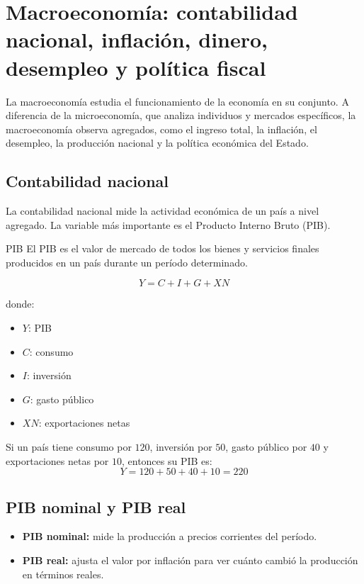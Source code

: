 \section{Macroeconomía: contabilidad nacional, inflación, dinero, desempleo y política fiscal}
\label{sec:macroeconomia}

La macroeconomía estudia el funcionamiento de la economía en su conjunto. A diferencia de la microeconomía, que analiza individuos y mercados específicos, la macroeconomía observa agregados, como el ingreso total, la inflación, el desempleo, la producción nacional y la política económica del Estado.

\subsection{Contabilidad nacional}

La contabilidad nacional mide la actividad económica de un país a nivel agregado. La variable más importante es el Producto Interno Bruto (PIB).

\begin{concepto}{PIB}
El PIB es el valor de mercado de todos los bienes y servicios finales producidos en un país durante un período determinado.
\end{concepto}

\begin{equation}
Y = C + I + G + XN
\end{equation}

donde:
\begin{itemize}
    \item $Y$: PIB
    \item $C$: consumo
    \item $I$: inversión
    \item $G$: gasto público
    \item $XN$: exportaciones netas
\end{itemize}

\begin{ejemplo}
Si un país tiene consumo por $120$, inversión por $50$, gasto público por $40$ y exportaciones netas por $10$, entonces su PIB es:
\[Y = 120 + 50 + 40 + 10 = 220
\]
\end{ejemplo}

\subsection{PIB nominal y PIB real}

\begin{itemize}
    \item \textbf{PIB nominal:} mide la producción a precios corrientes del período.
    \item \textbf{PIB real:} ajusta el valor por inflación para ver cuánto cambió la producción en términos reales.
\end{itemize}

